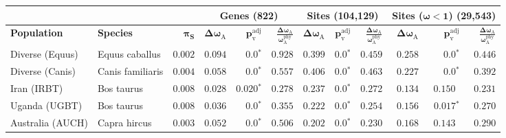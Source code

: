 \documentclass{article}
\newcommand{\rateApop}{\omega_{\mathrm{A}}}
\newcommand{\rateAphy}{\rateApop^{\mathrm{phy}}}
\begin{document}
    \begin{table*}[!ht]
        \centering
        \begin{adjustbox}{width = 1\textwidth}
            \begin{tabular}{||l|l|r||r|r|r||r|r|r||r|r|r||}
                \toprule
                \multicolumn{3}{||c||}{} &
                \multicolumn{3}{c||}{\textbf{Genes (822)}} &
                \multicolumn{3}{c||}{\textbf{Sites (104,129)}} &
                \multicolumn{3}{c||}{\textbf{Sites ($\bm{\omega < 1}$) (29,543)}}
                \\ \hline
                \textbf{Population} &
                \textbf{Species} &
                $\bm{\pi_{\textrm{S}}}$ &
                $\bm{\Delta \rateApop}$ &
                $\bm{p_{\mathrm{v}}^{\mathrm{adj}}}$    &
                $\bm{\frac{\Delta\rateApop}{\rateAphy}}$ &
                $\bm{\Delta \rateApop}$ &
                $\bm{p_{\mathrm{v}}^{\mathrm{adj}}}$          &
                $\bm{\frac{\Delta\rateApop}{\rateAphy}}$ &
                $\bm{\Delta \rateApop}$ &
                $\bm{p_{\mathrm{v}}^{\mathrm{adj}}}$ &
                $\bm{\frac{\Delta\rateApop}{\rateAphy}}$
                \\                \midrule
                Diverse (Equus)                                     & Equus caballus      & $ 0.002$ & $ 0.094$ & $\bm{0.0{^*}}$    & $ 0.928$ & $ 0.399$ & $\bm{0.0{^*}}$ & $ 0.459$ & $ 0.258$ & $\bm{0.0{^*}}$ & $ 0.446$ \\
                \rowcolor{LIGHTGREY} Diverse (Canis)                & Canis familiaris    & $ 0.004$ & $ 0.058$ & $\bm{0.0{^*}}$                  & $ 0.557$                                                                     & $ 0.406$ & $\bm{0.0{^*}}$ & $ 0.463$ & $ 0.227$ & $\bm{0.0{^*}}$ & $ 0.392$ \\
                Iran (IRBT)                                         & Bos taurus          & $ 0.008$ & $ 0.028$ & $\bm{ 0.020{^*}}$ & $ 0.278$ & $ 0.237$ & $\bm{0.0{^*}}$ & $ 0.272$ & $ 0.134$ & $ 0.150~~$ & $ 0.231$ \\
                Uganda (UGBT)                                       & Bos taurus          & $ 0.008$ & $ 0.036$ & $\bm{0.0{^*}}$    & $ 0.355$ & $ 0.222$ & $\bm{0.0{^*}}$ & $ 0.254$ & $ 0.156$ & $\bm{ 0.017{^*}}$ & $ 0.270$ \\
                \rowcolor{LIGHTGREY} Australia (AUCH)               & Capra hircus        & $ 0.003$ & $ 0.052$ & $\bm{0.0{^*}}$                  & $ 0.506$                                                                     & $ 0.202$ & $\bm{0.0{^*}}$ & $ 0.230$ & $ 0.168$ & $ 0.143~~$ & $ 0.290$ \\

\end{tabular}
\end{adjustbox}
\end{table*}
\end{document}

